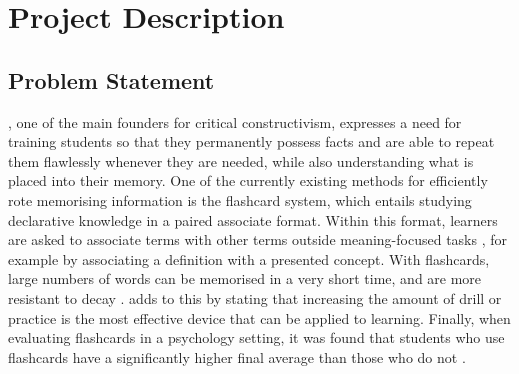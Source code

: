 \chapter{Project Description}

\section{Problem Statement}





, one of the main founders for critical constructivism, expresses a need for training students so that they permanently possess facts and are able to repeat them flawlessly whenever they are needed, while also understanding what is placed into their memory. One of the currently existing methods for efficiently rote memorising information is the flashcard system, which entails studying declarative knowledge in a paired associate format. Within this format, learners are asked to associate terms with other terms outside meaning-focused tasks \cite{nakata}, for example by associating a definition with a presented concept. With flashcards, large numbers of words can be memorised in a very short time, and are more resistant to decay \cite{nakata, joseph}.  adds to this by stating that increasing the amount of drill or practice is the most effective device that can be applied to learning. Finally, when evaluating flashcards in a psychology setting, it was found that students who use flashcards have a significantly higher final average than those who do not \cite{burgess, golding}.

